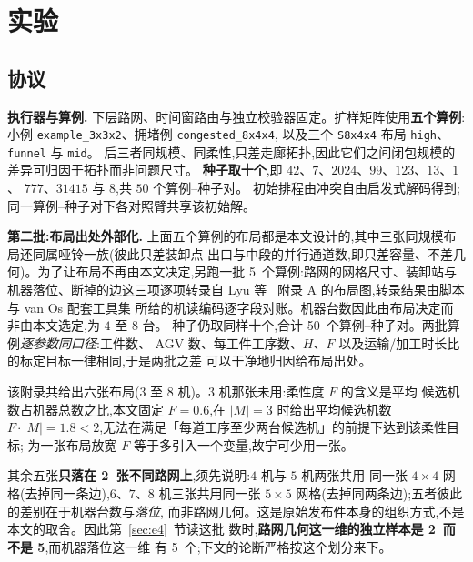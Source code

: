 \documentclass[manuscript,screen,review]{acmart}
\newcommand{\NPairs}{50}
\newcommand{\NPubInst}{5}
\newcommand{\NPubPairs}{50}
\newcommand{\NPubNets}{2}
\begin{document}
\section{实验}
\label{sec:experiments}

\subsection{协议}
\label{sec:protocol}

\textbf{执行器与算例.}
下层路网、时间窗路由与独立校验器固定。扩样矩阵使用\textbf{五个算例}:
小例 \texttt{example\_3x3x2}、拥堵例 \texttt{congested\_8x4x4},
以及三个 \texttt{S8x4x4} 布局 \texttt{high}、\texttt{funnel} 与 \texttt{mid}。
后三者同规模、同柔性,只差走廊拓扑,因此它们之间闭包规模的差异可归因于拓扑而非问题尺寸。
\textbf{种子取十个},即 \(42\)、\(7\)、\(2024\)、\(99\)、\(123\)、\(13\)、\(1\)、
\(777\)、\(31415\) 与 \(8\),共 \(\NPairs\) 个算例--种子对。
初始排程由冲突自由启发式解码得到;同一算例--种子对下各对照臂共享该初始解。

\textbf{第二批:布局出处外部化.}
上面五个算例的布局都是本文设计的,其中三张同规模布局还同属哑铃一族(彼此只差装卸点
出口与中段的并行通道数,即只差容量、不差几何)。为了让布局不再由本文决定,另跑一批
\NPubInst\ 个算例:路网的网格尺寸、装卸站与机器落位、断掉的边这三项逐项转录自
Lyu 等~\cite{lyu2019approach} 附录 A 的布局图,转录结果由脚本与 van Os 配套工具集
所给的机读编码逐字段对账。机器台数因此由布局决定而非由本文选定,为 \(4\) 至 \(8\) 台。
种子仍取同样十个,合计 \NPubPairs\ 个算例--种子对。两批算例\emph{逐参数同口径}:工件数、
AGV 数、每工件工序数、\(H\)、\(F\) 以及运输/加工时长比的标定目标一律相同,于是两批之差
可以干净地归因给布局出处。

该附录共给出六张布局(\(3\) 至 \(8\) 机)。\(3\) 机那张未用:柔性度 \(F\) 的含义是平均
候选机数占机器总数之比,本文固定 \(F=0.6\),在 \(|M|=3\) 时给出平均候选机数
\(F\cdot|M|=1.8<2\),无法在满足「每道工序至少两台候选机」的前提下达到该柔性目标;
为一张布局放宽 \(F\) 等于多引入一个变量,故宁可少用一张。

其余五张\textbf{只落在 \NPubNets\ 张不同路网上},须先说明:\(4\) 机与 \(5\) 机两张共用
同一张 \(4\times 4\) 网格(去掉同一条边),\(6\)、\(7\)、\(8\) 机三张共用同一张
\(5\times 5\) 网格(去掉同两条边);五者彼此的差别在于机器台数与\emph{落位},
而非路网几何。这是原始发布件本身的组织方式,不是本文的取舍。因此第~\ref{sec:e4}~节读这批
数时,\textbf{路网几何这一维的独立样本是 \NPubNets\ 而不是 \NPubInst},而机器落位这一维
有 \NPubInst\ 个;下文的论断严格按这个划分来下。
\end{document}
